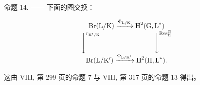 命题 14. —— 下面的图交换：

\[
\begin{array}{c} \operatorname{Br} (\mathrm{L} / \mathrm{K}) \xrightarrow {\Phi_ {\mathrm{L} / \mathrm{K}}} \operatorname{H} ^ {2} (\operatorname{G}, \operatorname{L} ^ {*}) \\ \Biggl \downarrow^ {r _ {\mathrm{K} ^ {\prime} / \mathrm{K}}} \qquad \qquad \qquad \qquad \Biggl \downarrow^ {\operatorname{Res} _ {\mathrm{H}} ^ {\mathrm{G}}} \\ \operatorname{Br} (\mathrm{L} / \mathrm{K} ^ {\prime}) \xrightarrow {\Phi_ {\mathrm{L} / \mathrm{K} ^ {\prime}}} \operatorname{H} ^ {2} (\operatorname{H}, \operatorname{L} ^ {*})  . \end{array}
\]

这由 VIII, 第 299 页的命题 7 与 VIII, 第 317 页的命题 13 得出。

